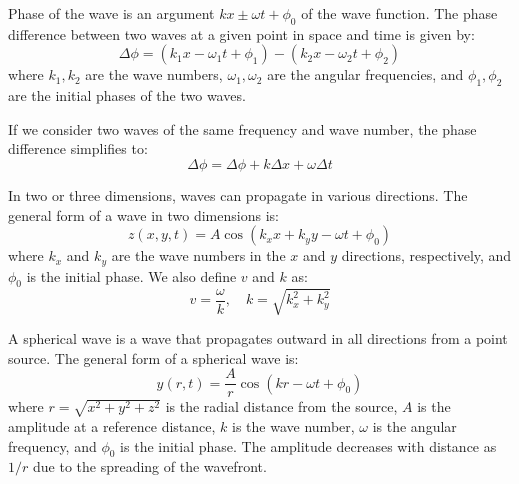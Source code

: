 \documentclass[11pt]{report}
\begin{document}
\begin{definition}
    Phase of the wave is an argument $kx \pm \omega t + \phi_0$ of the wave function. The phase difference between two waves at a given point in space and time is given by:
    $$
        \Delta \phi = (k_1 x - \omega_1 t + \phi_1) - (k_2 x - \omega_2 t + \phi_2)
    $$
    where \( k_1, k_2 \) are the wave numbers, \( \omega_1, \omega_2 \) are the angular frequencies, and \( \phi_1, \phi_2 \) are the initial phases of the two waves.

    If we consider two waves of the same frequency and wave number, the phase difference simplifies to:
    $$
        \Delta \phi = \Delta\phi + k\Delta x + \omega \Delta t
    $$

\end{definition}
\begin{definition}
    In two or three dimensions, waves can propagate in various directions. The general form of a wave in two dimensions is:
    $$
        z(x,y,t) = A \cos(k_x x + k_y y - \omega t + \phi_0)
    $$
    where \( k_x \) and \( k_y \) are the wave numbers in the \( x \) and \( y \) directions, respectively, and \( \phi_0 \) is the initial phase. We also define $v$ and $k$ as:
    $$
        v = \frac{\omega}{k}, \quad k = \sqrt{k_x^2 + k_y^2}
    $$
\end{definition}

\begin{definition}
    A spherical wave is a wave that propagates outward in all directions from a point source. The general form of a spherical wave is:
    $$
        y(r,t) = \frac{A}{r} \cos(kr - \omega t + \phi_0)
    $$
    where \( r = \sqrt{x^2 + y^2 + z^2} \) is the radial distance from the source, \( A \) is the amplitude at a reference distance, \( k \) is the wave number, \( \omega \) is the angular frequency, and \( \phi_0 \) is the initial phase. The amplitude decreases with distance as \( 1/r \) due to the spreading of the wavefront.
    
\end{definition}
\end{document}
